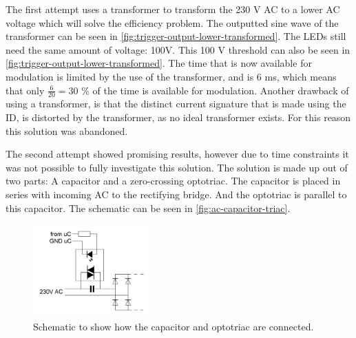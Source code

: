 	The first attempt uses a transformer to transform the 230 V AC to a lower AC voltage which will solve the efficiency problem.
	The outputted sine wave of the transformer can be seen in \autoref{fig:trigger-output-lower-transformed}.
	The LEDs still need the same amount of voltage: 100V.
	This 100 V threshold can also be seen in \autoref{fig:trigger-output-lower-transformed}.
	The time that is now available for modulation is limited by the use of the transformer, and is 6 ms, which means that only $\frac{6}{20} = 30$ \% of the time is available for modulation.
	Another drawback of using a transformer, is that the distinct current signature that is made using the ID, is distorted by the transformer, as no ideal transformer exists.
	For this reason this solution was abandoned.





	The second attempt showed promising results, however due to time constraints it was not possible to fully investigate this solution. 
	The solution is made up out of two parts: A capacitor and a zero-crossing optotriac.
	The capacitor is placed in series with incoming AC to the rectifying bridge.
	And the optotriac is parallel to this capacitor.
	The schematic can be seen in \autoref{fig:ac-capacitor-triac}.

	\begin{figure}[ht]
		\centering
		\includegraphics[angle=0,width=0.4\textwidth]{chapters/hardware-chapters/AC/ac-modulator/custom-hardware/ac-current-source/ac-capacitor-triac.JPG}
		\caption{Schematic to show how the capacitor and optotriac are connected.}
		\label{fig:ac-capacitor-triac}
	\end{figure}


